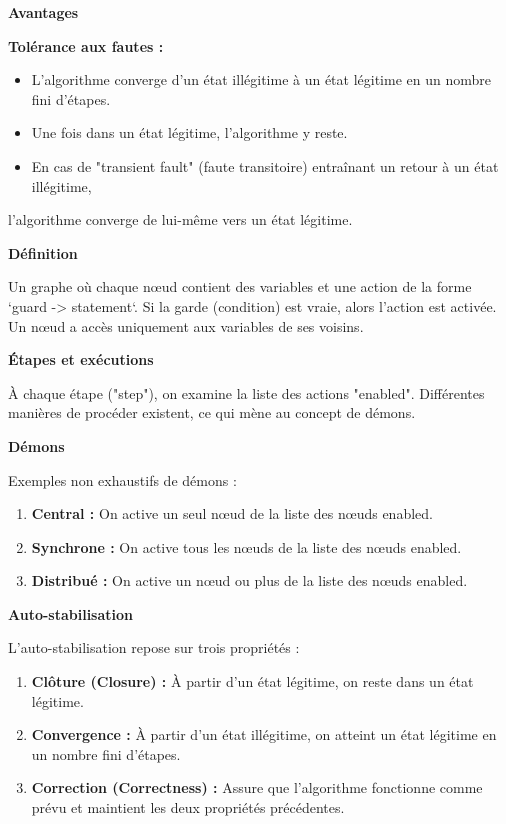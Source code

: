 \documentclass[11pt]{article}
\begin{document}
\textbf{\textbf{Avantages}}

\textbf{\textbf{Tolérance aux fautes :}}
\begin{itemize}
\item L'algorithme converge d'un état illégitime à un état légitime en un nombre fini d'étapes.
\item Une fois dans un état légitime, l'algorithme y reste.
\item En cas de "transient fault" (faute transitoire) entraînant un retour à un état illégitime,
\end{itemize}
l'algorithme converge de lui-même vers un état légitime.


\textbf{\textbf{Définition}}

Un graphe où chaque nœud contient des variables et une action de la forme `guard -> statement`. 
Si la garde (condition) est vraie, alors l'action est activée. Un nœud a accès uniquement aux variables de ses voisins.

\textbf{\textbf{Étapes et exécutions}}

À chaque étape ("step"), on examine la liste des actions "enabled". 
Différentes manières de procéder existent, ce qui mène au concept de démons.

\textbf{\textbf{Démons}}

Exemples non exhaustifs de démons :
\begin{enumerate}
\item \textbf{\textbf{Central :}} On active un seul nœud de la liste des nœuds enabled.
\item \textbf{\textbf{Synchrone :}} On active tous les nœuds de la liste des nœuds enabled.
\item \textbf{\textbf{Distribué :}} On active un nœud ou plus de la liste des nœuds enabled.
\end{enumerate}

\textbf{\textbf{Auto-stabilisation}}

L'auto-stabilisation repose sur trois propriétés :
\begin{enumerate}
\item \textbf{\textbf{Clôture (Closure) :}} À partir d'un état légitime, on reste dans un état légitime.
\item \textbf{\textbf{Convergence :}} À partir d'un état illégitime, on atteint un état légitime en un nombre fini d'étapes.
\item \textbf{\textbf{Correction (Correctness) :}} Assure que l'algorithme fonctionne comme prévu et maintient les deux propriétés précédentes.
\end{enumerate}
\end{document}

